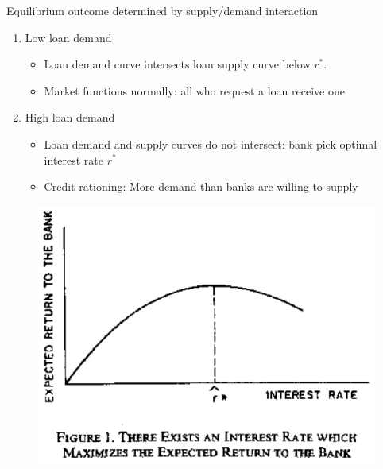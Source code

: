 \documentclass{beamer}
\begin{document}
\begin{frame}
 Equilibrium outcome determined by supply/demand interaction
\begin{enumerate}
  \item Low loan demand
  \begin{itemize}
    \item Loan demand curve intersects loan supply curve below $r^*$. 
    \item Market functions normally: all who request a loan receive one
\end{itemize}
  \item High loan demand
  \begin{itemize}
    \item Loan demand and supply curves do not intersect: bank pick optimal interest rate $r^*$    
    \item Credit rationing: More demand than banks are willing to supply
  \end{itemize}
\end{enumerate}
\end{frame}

\begin{frame}
  \begin{figure}
    \includegraphics{stiglitz_weiss1.eps}
  \end{figure}
\end{frame}
\end{document}
